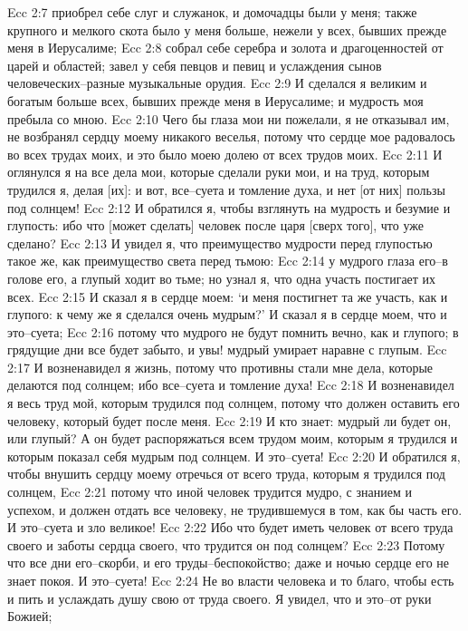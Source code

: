 Ecc 2:7  приобрел себе слуг и служанок, и домочадцы были у меня; также крупного и мелкого скота было у меня больше, нежели у всех, бывших прежде меня в Иерусалиме;
Ecc 2:8  собрал себе серебра и золота и драгоценностей от царей и областей; завел у себя певцов и певиц и услаждения сынов человеческих--разные музыкальные орудия.
Ecc 2:9  И сделался я великим и богатым больше всех, бывших прежде меня в Иерусалиме; и мудрость моя пребыла со мною.
Ecc 2:10  Чего бы глаза мои ни пожелали, я не отказывал им, не возбранял сердцу моему никакого веселья, потому что сердце мое радовалось во всех трудах моих, и это было моею долею от всех трудов моих.
Ecc 2:11  И оглянулся я на все дела мои, которые сделали руки мои, и на труд, которым трудился я, делая [их]: и вот, все--суета и томление духа, и нет [от них] пользы под солнцем!
Ecc 2:12  И обратился я, чтобы взглянуть на мудрость и безумие и глупость: ибо что [может сделать] человек после царя [сверх того], что уже сделано?
Ecc 2:13  И увидел я, что преимущество мудрости перед глупостью такое же, как преимущество света перед тьмою:
Ecc 2:14  у мудрого глаза его--в голове его, а глупый ходит во тьме; но узнал я, что одна участь постигает их всех.
Ecc 2:15  И сказал я в сердце моем: `и меня постигнет та же участь, как и глупого: к чему же я сделался очень мудрым?' И сказал я в сердце моем, что и это--суета;
Ecc 2:16  потому что мудрого не будут помнить вечно, как и глупого; в грядущие дни все будет забыто, и увы! мудрый умирает наравне с глупым.
Ecc 2:17  И возненавидел я жизнь, потому что противны стали мне дела, которые делаются под солнцем; ибо все--суета и томление духа!
Ecc 2:18  И возненавидел я весь труд мой, которым трудился под солнцем, потому что должен оставить его человеку, который будет после меня.
Ecc 2:19  И кто знает: мудрый ли будет он, или глупый? А он будет распоряжаться всем трудом моим, которым я трудился и которым показал себя мудрым под солнцем. И это--суета!
Ecc 2:20  И обратился я, чтобы внушить сердцу моему отречься от всего труда, которым я трудился под солнцем,
Ecc 2:21  потому что иной человек трудится мудро, с знанием и успехом, и должен отдать все человеку, не трудившемуся в том, как бы часть его. И это--суета и зло великое!
Ecc 2:22  Ибо что будет иметь человек от всего труда своего и заботы сердца своего, что трудится он под солнцем?
Ecc 2:23  Потому что все дни его--скорби, и его труды--беспокойство; даже и ночью сердце его не знает покоя. И это--суета!
Ecc 2:24  Не во власти человека и то благо, чтобы есть и пить и услаждать душу свою от труда своего. Я увидел, что и это--от руки Божией;
